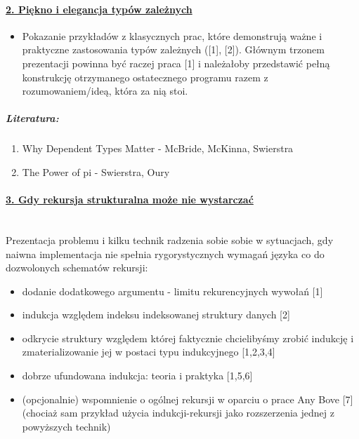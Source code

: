\documentclass[10pt, a4paper]{article}
\begin{document}
\paragraph{\underline{2. Piękno i elegancja typów zależnych}}

\begin{itemize}
 \item 
Pokazanie przykładów z klasycznych prac, które demonstrują ważne i praktyczne zastosowania typów zależnych ([1], [2]). Głównym trzonem prezentacji powinna być raczej praca [1] i należałoby przedstawić pełną konstrukcję otrzymanego ostatecznego programu razem z rozumowaniem/ideą, która za nią stoi.
\end{itemize}

\subparagraph{Literatura:}

\begin{enumerate}
\addtolength{\itemsep}{-0.5\baselineskip}

 \item Why Dependent Types Matter - McBride, McKinna, Swierstra
 \item The Power of pi - Swierstra, Oury
\end{enumerate}

\paragraph{\underline{3. Gdy rekursja strukturalna może nie wystarczać}}
~ \\

Prezentacja problemu i kilku technik radzenia sobie sobie w sytuacjach, gdy naiwna implementacja nie spełnia rygorystycznych wymagań języka co do dozwolonych schematów rekursji:

\begin{itemize}
\addtolength{\itemsep}{-0.5\baselineskip}

 \item 
    dodanie dodatkowego argumentu - limitu rekurencyjnych wywołań [1]
 \item 
    indukcja względem indeksu indeksowanej struktury danych [2]
 \item 
    odkrycie struktury względem której faktycznie chcielibyśmy zrobić indukcję i zmaterializowanie jej w postaci typu indukcyjnego [1,2,3,4]
 \item 
    dobrze ufundowana indukcja: teoria i praktyka [1,5,6]
 \item 
    (opcjonalnie) wspomnienie o ogólnej rekursji w oparciu o prace Any Bove [7] (chociaż sam przykład użycia indukcji-rekursji jako rozszerzenia jednej z powyższych technik)

\end{itemize}
\end{document}
